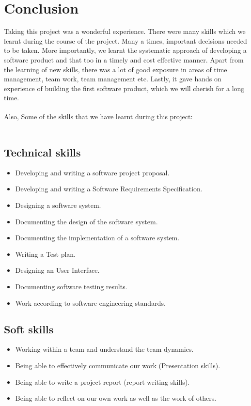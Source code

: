 \documentclass{article}
\begin{document}
\section{Conclusion}
Taking this project was a wonderful experience. There were many skills which we
learnt during the course of the project. Many a times, important decisions
needed to be taken. More importantly, we learnt the systematic approach of
developing a software product and that too in a timely and cost effective
manner. Apart from the learning of new skills, there was a lot of good exposure in
areas of time management, team work, team management etc. Lastly, it gave
hands on experience of building the first software product, which we will cherish
for a long time.\\~\\
Also, Some of the skills that we have learnt during this project:\\~\\
\subsection{Technical skills}
\begin{itemize}
  \item Developing and writing a software project proposal.
  \item Developing and writing a Software Requirements Specification.
  \item Designing a software system.
  \item Documenting the design of the software system.
  \item Documenting the implementation of a software system.
  \item Writing a Test plan.
  \item Designing an User Interface.
  \item Documenting software testing results.
  \item Work according to software engineering standards.
\end{itemize}

\subsection{Soft skills}
\begin{itemize}
  \item Working within a team and understand the team dynamics.
  \item Being able to effectively communicate our work (Presentation skills).
  \item Being able to write a project report (report writing skills).
  \item Being able to reflect on our own work as well as the work of others.
\end{itemize}
\end{document}
